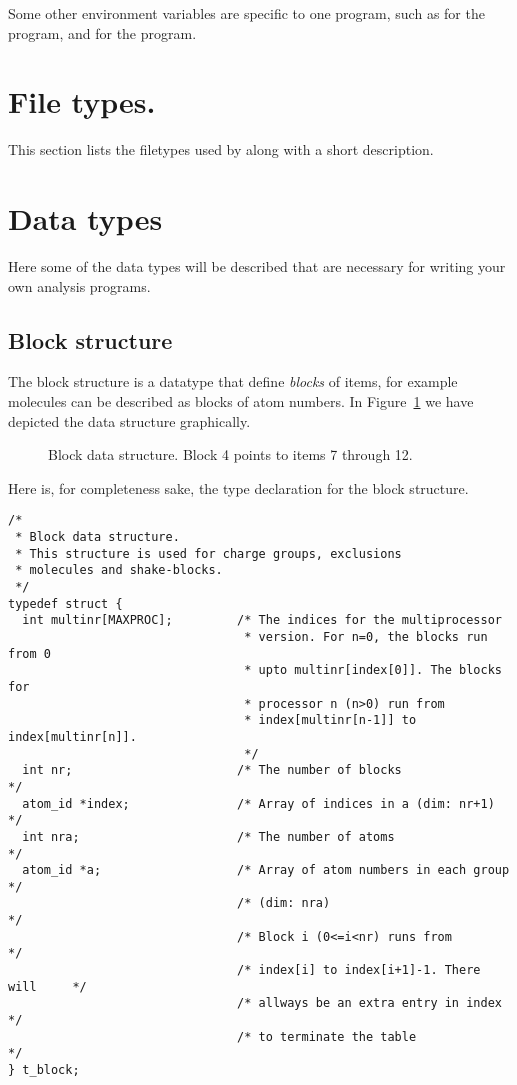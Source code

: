 Some other environment variables are specific to one program, such as
 for the  program, and
 for the  program.

\section{File types.}
\label{sec:fileformats}
This section lists the filetypes used by {\gromacs} along with a 
short description.


\section{Data types}
Here some of the data types will be described that are necessary for writing
your own analysis programs.

\subsection{Block structure}
The block structure is a datatype that define {\em blocks} of items,
for example molecules can be described as blocks of atom numbers.
In Figure~\ref{fig:block} we have depicted the data structure graphically.
\begin{figure}[ht]
\centerline{}
\caption{Block data structure. Block 4 points to items 7 through 12.}
\label{fig:block}
\end{figure}

Here is, for completeness sake,
the type declaration for the block structure.
\begin{verbatim}
/*
 * Block data structure.
 * This structure is used for charge groups, exclusions
 * molecules and shake-blocks.
 */
typedef struct {
  int multinr[MAXPROC];         /* The indices for the multiprocessor 
                                 * version. For n=0, the blocks run from 0
                                 * upto multinr[index[0]]. The blocks for 
                                 * processor n (n>0) run from 
                                 * index[multinr[n-1]] to index[multinr[n]].
                                 */
  int nr;                       /* The number of blocks                     */
  atom_id *index;               /* Array of indices in a (dim: nr+1)        */
  int nra;                      /* The number of atoms                      */
  atom_id *a;                   /* Array of atom numbers in each group      */
                                /* (dim: nra)                               */
                                /* Block i (0<=i<nr) runs from              */
                                /* index[i] to index[i+1]-1. There will     */
                                /* allways be an extra entry in index       */
                                /* to terminate the table                   */
} t_block;
\end{verbatim}



